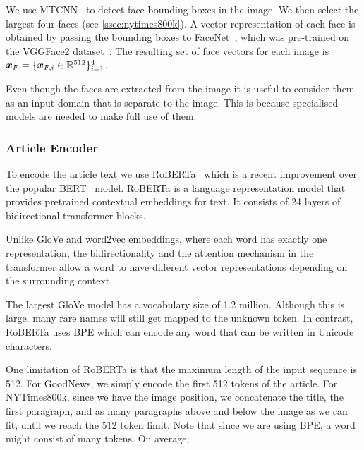 We use MTCNN~\cite{Zhang2016JointFD} to detect face bounding boxes in the
image. We then select the largest four faces (see \ref{ssec:nytimes800k}). A
vector representation of each face is obtained by passing the bounding boxes to
FaceNet~\cite{Schroff2015FaceNetAU}, which was pre-trained on the VGGFace2
dataset~\cite{Cao2017VGGFace2AD}. The resulting set of face vectors for each
image is $\bm{x}_{F} = \{\bm{x}_{F,i} \in \mathbb{R}^{512}\}_{i=1}^4$.

Even though the faces are extracted from the image it is useful to consider
them as an input domain that is separate to the image. This is because
specialised models are needed to make full use of them.



\subsubsection{Article Encoder}

To encode the article text we use RoBERTa~\cite{Liu2019RoBERTaAR} which is a
recent improvement over the popular BERT~\cite{Devlin2019BERT} model.
RoBERTa is a language representation model that provides pretrained contextual
embeddings for text. It consists of 24 layers of bidirectional transformer
blocks.

Unlike GloVe \cite{Pennington2014Glove} and word2vec
\cite{Mikolov2013DistributedRO} embeddings, where each word has exactly one
representation, the bidirectionality and the attention mechanism in the
transformer allow a word to have different vector representations depending on
the surrounding context.

The largest GloVe model has a vocabulary size of 1.2 million. Although this is
large, many rare names will still get mapped to the unknown token. In contrast,
RoBERTa uses BPE \cite{Sennrich2015NeuralMT,Radford2019LanguageMA} which can
encode any word that can be written in Unicode characters.

One limitation of RoBERTa is that the maximum length of the input sequence is
512. For GoodNews, we simply encode the first 512 tokens of the article. For
NYTimes800k, since we have the image position, we concatenate the title, the
first paragraph, and as many paragraphs above and below the image as we can
fit, until we reach the 512 token limit. Note that since we are using BPE, a
word might consist of many tokens. On average, 

